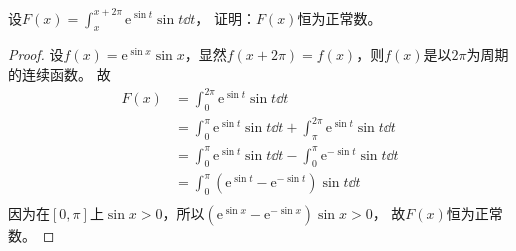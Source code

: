 \begin{example}
    设$\displaystyle F(x) = \int_x^{x+2\pi} \mathrm{e}^{\sin t}\sin t\dd{t}$，
    证明：$F(x)$恒为正常数。
\end{example}

\begin{proof}
    设$f(x)= \mathrm{e}^{\sin x}\sin x$，显然$f(x+2\pi) = f(x)$，则$f(x)$是以$2\pi$为周期的连续函数。
    故
    \begin{align}
        F(x) & = \int_0^{2\pi} \mathrm{e}^{\sin t}\sin t\dd{t}                                                  \\
             & = \int_0^{\pi}\mathrm{e}^{\sin t}\sin t\dd{t} + \int_{\pi}^{2\pi}\mathrm{e}^{\sin t}\sin t\dd{t} \\
             & = \int_0^{\pi}\mathrm{e}^{\sin t}\sin t\dd{t} - \int_0^{\pi}\mathrm{e}^{-\sin t}\sin t\dd{t}     \\
             & = \int_0^{\pi}\left(\mathrm{e}^{\sin t} - \mathrm{e}^{-\sin t}\right)\sin t\dd{t}                \\
    \end{align}
    因为在$[0,\pi]$上$\sin x > 0$，所以$\left(\mathrm{e}^{\sin x} - \mathrm{e}^{-\sin x}\right)\sin x >0$，
    故$F(x)$恒为正常数。
\end{proof}

